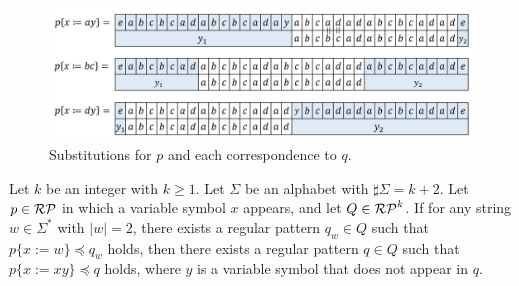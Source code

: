 \begin{figure}[t]
\begin{center}
\includegraphics[scale=0.45]{figs/Exam_b=a_c=d.png}
\end{center}
\caption{Substitutions for $p$ and each correspondence to $q$.}
\label{b=aとc=dの例}
\end{figure}

\begin{lem}\label{追加補題1}
Let $k$ be an integer with $k\geq 1$.
Let $\Sigma$ be an alphabet with $\sharp \Sigma = k + 2$.
Let $p \in \mathcal{RP}$ in which a variable symbol $x$ appears, and let $Q \in \mathcal{RP}^{k}$.
If for any string $w \in \Sigma^{\ast}$ with $|w|=2$, there exists a regular pattern $q_{w} \in Q$ such that $p \{ x:=w \} \preceq q_{w}$ holds, then there exists a regular pattern $q \in Q$ such that $p \{ x:=xy \} \preceq q$ holds, where $y$ is a variable symbol that does not appear in $q$.
\end{lem}

